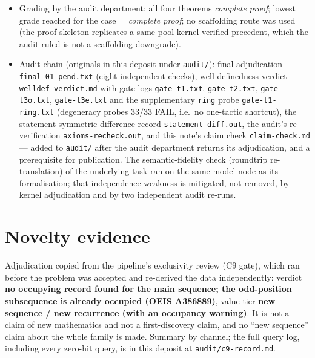 \documentclass[11pt]{article}
\theoremstyle{definition}
\begin{document}
\begin{itemize}
\texttt{audit/audit-strict-compile.log} and
\texttt{audit/audit-axioms-sidecar.log} (the four lines above are that log's
payload; the shipped copy adds a three-line provenance header, and the audit's
re-run \texttt{audit/axioms-recheck.out} is byte-identical to the task's own
axiom printout).
\item Grading by the audit department: all four theorems \emph{complete proof};
lowest grade reached for the case = \emph{complete proof}; no scaffolding route
was used (the proof skeleton replicates a same-pool kernel-verified precedent,
which the audit ruled is not a scaffolding downgrade).
\item Audit chain (originals in this deposit under \texttt{audit/}): final
adjudication \texttt{final-01-pend.txt} (eight independent checks),
well-definedness verdict \texttt{welldef-verdict.md} with gate logs
\texttt{gate-t1.txt}, \texttt{gate-t2.txt}, \texttt{gate-t3o.txt},
\texttt{gate-t3e.txt} and the supplementary \texttt{ring} probe
\texttt{gate-t1-ring.txt} (degeneracy probes $33/33$ FAIL, i.e.\ no one-tactic
shortcut), the statement symmetric-difference record
\texttt{statement-diff.out}, the audit's re-verification
\texttt{axioms-recheck.out}, and this note's claim check
\texttt{claim-check.md} --- added to \texttt{audit/} after the audit department
returns its adjudication, and a prerequisite for publication. The
semantic-fidelity check (roundtrip re-translation) of the underlying task ran
on the same model node as its formalisation; that independence weakness is
mitigated, not removed, by kernel adjudication and by two independent audit
re-runs.
\end{itemize}

\section{Novelty evidence}\label{sec:novelty}

Adjudication copied from the pipeline's exclusivity review (C9 gate), which ran
before the problem was accepted and re-derived the data independently: verdict
\textbf{no occupying record found for the main sequence; the odd-position
subsequence is already occupied (OEIS A386889)}, value tier \textbf{new
sequence / new recurrence (with an occupancy warning)}. It is not a claim of
new mathematics and not a first-discovery claim, and no ``new sequence'' claim
about the whole family is made. Summary by channel; the full query log,
including every zero-hit query, is in this deposit at
\texttt{audit/c9-record.md}.
\end{document}
